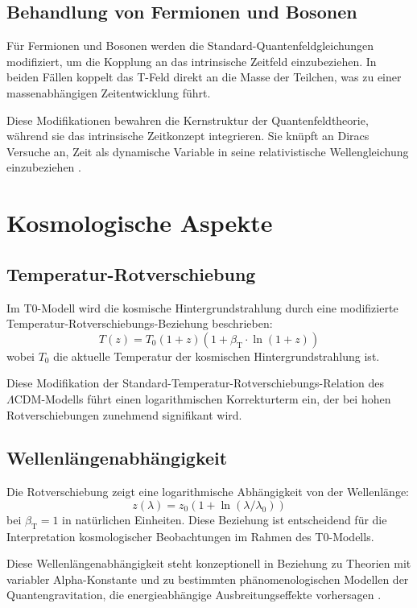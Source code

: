 \documentclass[a4paper,12pt]{article}
\newcommand{\betaT}{\beta_{\text{T}}}
\newcommand{\LCDM}{\Lambda\text{CDM}}
\begin{document}
	\subsection{Behandlung von Fermionen und Bosonen}
	Für Fermionen und Bosonen werden die Standard-Quantenfeldgleichungen modifiziert, um die Kopplung an das intrinsische Zeitfeld einzubeziehen. In beiden Fällen koppelt das T-Feld direkt an die Masse der Teilchen, was zu einer massenabhängigen Zeitentwicklung führt.
	
	Diese Modifikationen bewahren die Kernstruktur der Quantenfeldtheorie, während sie das intrinsische Zeitkonzept integrieren. Sie knüpft an Diracs Versuche an, Zeit als dynamische Variable in seine relativistische Wellengleichung einzubeziehen \cite{Dirac1928}.
	
	\section{Kosmologische Aspekte}
	
	\subsection{Temperatur-Rotverschiebung}
	Im T0-Modell wird die kosmische Hintergrundstrahlung durch eine modifizierte Temperatur-Rotverschiebungs-Beziehung beschrieben:
	\[
	T(z) = T_0 (1+z)(1+\betaT \cdot \ln(1+z))
	\]
	wobei $T_0$ die aktuelle Temperatur der kosmischen Hintergrundstrahlung ist.
	
	Diese Modifikation der Standard-Temperatur-Rotverschiebungs-Relation des $\LCDM{}$-Modells \cite{Peebles2003} führt einen logarithmischen Korrekturterm ein, der bei hohen Rotverschiebungen zunehmend signifikant wird.
	
	\subsection{Wellenlängenabhängigkeit}
	Die Rotverschiebung zeigt eine logarithmische Abhängigkeit von der Wellenlänge:
	\[
	z(\lambda) = z_0(1+\ln(\lambda/\lambda_0))
	\]
	bei $\betaT = 1$ in natürlichen Einheiten. Diese Beziehung ist entscheidend für die Interpretation kosmologischer Beobachtungen im Rahmen des T0-Modells.
	
	Diese Wellenlängenabhängigkeit steht konzeptionell in Beziehung zu Theorien mit variabler Alpha-Konstante \cite{Webb1999} und zu bestimmten phänomenologischen Modellen der Quantengravitation, die energieabhängige Ausbreitungseffekte vorhersagen \cite{AmelinoCamelia1998}.
	
\end{document}
